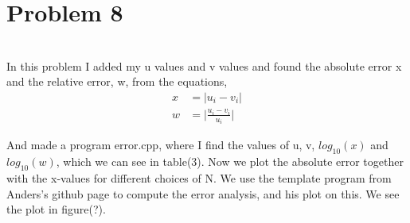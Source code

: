 \documentclass[english,notitlepage]{revtex4-1}  %
\begin{document}
  \section*{Problem 8}\
 \\
 In this problem I added my u values and v values and found the absolute error x and the relative error, w, from the equations,
  \begin{align*}
x &= |u_i - v_i | \\
w &= \bigg| \frac{u_i - v_i}{u_i} \bigg|
 \end{align*}

 And made a program error.cpp, where I find the values of u, v, $log_{10}(x)$ and $log_{10}(w)$, which we can see in table(3). Now we plot the absolute error together with the x-values for different choices of N. We use the template program from Anders's github page to compute the error analysis, and his plot on this. We see the plot in figure(?).
\end{document}
